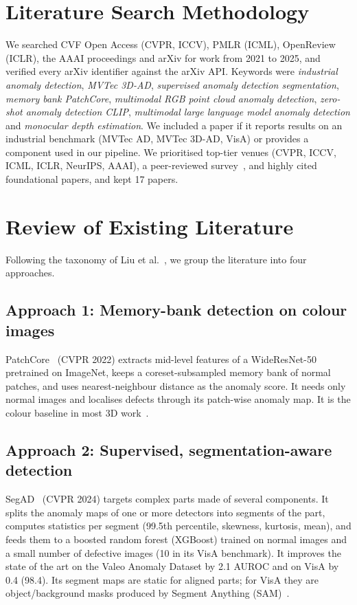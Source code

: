 \documentclass[conference]{IEEEtran}
\begin{document}
\section{Literature Search Methodology}
We searched CVF Open Access (CVPR, ICCV), PMLR (ICML), OpenReview (ICLR), the AAAI proceedings and arXiv for work from 2021 to 2025, and verified every arXiv identifier against the arXiv API. Keywords were \emph{industrial anomaly detection}, \emph{MVTec 3D-AD}, \emph{supervised anomaly detection segmentation}, \emph{memory bank PatchCore}, \emph{multimodal RGB point cloud anomaly detection}, \emph{zero-shot anomaly detection CLIP}, \emph{multimodal large language model anomaly detection} and \emph{monocular depth estimation}. We included a paper if it reports results on an industrial benchmark (MVTec AD, MVTec 3D-AD, VisA) or provides a component used in our pipeline. We prioritised top-tier venues (CVPR, ICCV, ICML, ICLR, NeurIPS, AAAI), a peer-reviewed survey~\cite{survey}, and highly cited foundational papers, and kept 17 papers.

\section{Review of Existing Literature}
Following the taxonomy of Liu et al.~\cite{survey}, we group the literature into four approaches.

\subsection{Approach 1: Memory-bank detection on colour images}
PatchCore~\cite{patchcore} (CVPR 2022) extracts mid-level features of a WideResNet-50 pretrained on ImageNet, keeps a coreset-subsampled memory bank of normal patches, and uses nearest-neighbour distance as the anomaly score. It needs only normal images and localises defects through its patch-wise anomaly map. It is the colour baseline in most 3D work~\cite{btf,m3dm}.

\subsection{Approach 2: Supervised, segmentation-aware detection}
SegAD~\cite{segad} (CVPR 2024) targets complex parts made of several components. It splits the anomaly maps of one or more detectors into segments of the part, computes statistics per segment (99.5th percentile, skewness, kurtosis, mean), and feeds them to a boosted random forest (XGBoost) trained on normal images and a small number of defective images (10 in its VisA benchmark). It improves the state of the art on the Valeo Anomaly Dataset by 2.1 AUROC and on VisA by 0.4 (98.4). Its segment maps are static for aligned parts; for VisA they are object/background masks produced by Segment Anything (SAM)~\cite{sam}.
\end{document}
